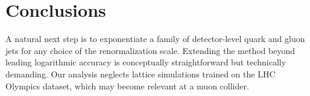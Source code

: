 \section{Conclusions}\label{sec:conclusions}

A natural next step is to exponentiate a family of detector-level quark
and gluon jets for any choice of the renormalization scale. Extending
the method beyond leading logarithmic accuracy is conceptually
straightforward but technically demanding. Our analysis neglects lattice
simulations trained on the LHC Olympics dataset, which may become
relevant at a muon collider.

